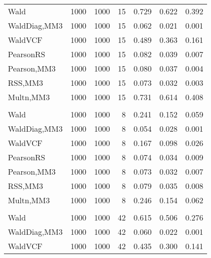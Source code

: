 \documentclass[
]{article}
\begin{document}
\begin{table}[H]
{\begin{tabular}[t]{lrrrrrr}
\hspace{1em}Wald & 1000 & 1000 & 15 & 0.729 & 0.622 & 0.392\\
\hspace{1em}WaldDiag,MM3 & 1000 & 1000 & 15 & 0.062 & 0.021 & 0.001\\
\hspace{1em}WaldVCF & 1000 & 1000 & 15 & 0.489 & 0.363 & 0.161\\
\hspace{1em}PearsonRS & 1000 & 1000 & 15 & 0.082 & 0.039 & 0.007\\
\hspace{1em}Pearson,MM3 & 1000 & 1000 & 15 & 0.080 & 0.037 & 0.004\\
\hspace{1em}RSS,MM3 & 1000 & 1000 & 15 & 0.073 & 0.032 & 0.003\\
\hspace{1em}Multn,MM3 & 1000 & 1000 & 15 & 0.731 & 0.614 & 0.408\\
\addlinespace[0.3em]
\multicolumn{7}{l}{\textbf{2F 10V}}\\
\hspace{1em}Wald & 1000 & 1000 & 8 & 0.241 & 0.152 & 0.059\\
\hspace{1em}WaldDiag,MM3 & 1000 & 1000 & 8 & 0.054 & 0.028 & 0.001\\
\hspace{1em}WaldVCF & 1000 & 1000 & 8 & 0.167 & 0.098 & 0.026\\
\hspace{1em}PearsonRS & 1000 & 1000 & 8 & 0.074 & 0.034 & 0.009\\
\hspace{1em}Pearson,MM3 & 1000 & 1000 & 8 & 0.073 & 0.032 & 0.007\\
\hspace{1em}RSS,MM3 & 1000 & 1000 & 8 & 0.079 & 0.035 & 0.008\\
\hspace{1em}Multn,MM3 & 1000 & 1000 & 8 & 0.246 & 0.154 & 0.062\\
\addlinespace[0.3em]
\multicolumn{7}{l}{\textbf{3F 15V}}\\
\hspace{1em}Wald & 1000 & 1000 & 42 & 0.615 & 0.506 & 0.276\\
\hspace{1em}WaldDiag,MM3 & 1000 & 1000 & 42 & 0.060 & 0.022 & 0.001\\
\hspace{1em}WaldVCF & 1000 & 1000 & 42 & 0.435 & 0.300 & 0.141\\

\end{tabular}}
\end{table}
\end{document}
